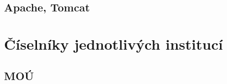 \documentclass[11pt, draft, oneside]{fithesis2}
\begin{document}
\begin{appendix}
\section{Apache, Tomcat}


\chapter{Číselníky jednotlivých institucí}

\section{MOÚ}


\end{appendix}
\end{document}
